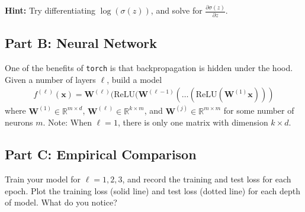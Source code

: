 \documentclass{article}
\begin{document}
\textbf{Hint:} Try differentiating $\log (\sigma(z))$, and solve for $\frac{\partial \sigma(z)}{\partial z}$.

\subsection*{Part B: Neural Network}

One of the benefits of \texttt{torch} is that backpropagation is hidden under the hood.
Given a number of layers $\ell$, build a model
\begin{align}
    f^{(\ell)}(\mathbf{x}) =
    \mathbf{W}^{(\ell)} (\text{ReLU}(\mathbf{W}^{(\ell-1)}(\ldots
    (\text{ReLU}(\mathbf{W}^{(1)}\mathbf{x})))
\end{align}
where $\mathbf{W}^{(1)} \in \mathbb{R}^{m \times d}$,
$\mathbf{W}^{(\ell)} \in \mathbb{R}^{k \times m}$, and
$\mathbf{W}^{(j)} \in \mathbb{R}^{m \times m}$ for some number of neurons $m$.
Note: When $\ell=1$, there is only one matrix with dimension $k \times d$.

\subsection*{Part C: Empirical Comparison}
Train your model for $\ell=1,2,3$, and record the training and test loss for each epoch.
Plot the training loss (solid line) and test loss (dotted line) for each depth of model. What do you notice?

%
\end{document}
